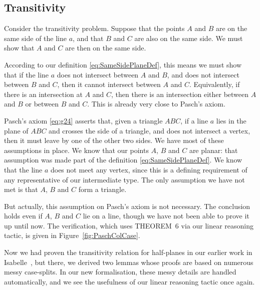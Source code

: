 \subsection{Transitivity}
Consider the transitivity problem. Suppose that the points $A$ and $B$ are on the same side of the line $a$, and that $B$ and $C$ are also on the same side. We must show that $A$ and $C$ are then on the same side.

According to our definition \eqref{eq:SameSidePlaneDef}, this means we must show that if the line $a$ does not intersect between $A$ and $B$, and does not intersect between $B$ and $C$, then it cannot intersect between $A$ and $C$. Equivalently, if there is an intersection at $A$ and $C$, then there is an intersection either between $A$ and $B$ or between $B$ and $C$. This is already very close to Pasch's axiom.

Pasch's axiom \eqref{eq:g24} asserts that, given a triangle $ABC$, if a line $a$ lies in the plane of $ABC$ and crosses the side of a triangle, and does not intersect a vertex, then it must leave by one of the other two sides. We have most of these assumptions in place. We know that our points $A$, $B$ and $C$ are planar: that assumption was made part of the definition \eqref{eq:SameSidePlaneDef}. We know that the line $a$ does not meet any vertex, since this is a defining requirement of any representative of our intermediate type. The only assumption we have not met is that $A$, $B$ and $C$ form a triangle.

But actually, this assumption on Pasch's axiom is not necessary. The conclusion holds even if $A$, $B$ and $C$ lie on a line, though we have not been able to prove it up until now. The verification, which uses THEOREM~6 via our linear reasoning tactic, is given in Figure~\ref{fig:PaschColCase}. 

Now we had proven the transitivity relation for half-planes in our earlier work in Isabelle~\cite{ScottMScThesis}, but there, we derived two lemmas whose proofs are based on numerous messy case-splits. In our new formalisation, these messy details are handled automatically, and we see the usefulness of our linear reasoning tactic once again.

